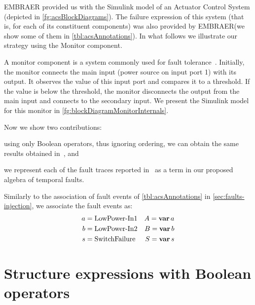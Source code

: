 \documentclass[12pt,openright,twoside,a4paper,oldfontcommands,english,brazil,final]{abntex2}
\theoremstyle{theo}
\newcommand{\EMBRAER}{EMBRAER\xspace}
\newcommand{\simulink}{Simulink\xspace}
\def\varop{\ensuremath\operatorname{\mathbf{var}}}
\newcommand{\var}[1]{\ensuremath\varop #1}
\begin{document}
\EMBRAER provided us with the \simulink model of an Actuator Control System (depicted in \cref{fg:acsBlockDiagrams}).
The failure expression of this system (that is, for each of its constituent components) was also provided by \EMBRAER (we show some of them in \cref{tbl:acsAnnotations}).
In what follows we illustrate our strategy using the Monitor component.

A monitor component is a system commonly used for fault tolerance~\cite{ONB2002,KK2007}.
Initially, the monitor connects the main input (power source on input port 1) with its output.
It observes the value of this input port and compares it to a threshold.
If the value is below the threshold, the monitor disconnects the output from the main input and connects to the secondary input.
We present the \simulink model for this monitor in \cref{fg:blockDiagramMonitorInternals}.


Now we show two contributions:
\begin{alineasinline}
  \item using only Boolean operators, thus ignoring ordering, we can obtain the same results obtained in~\cite{DM2012}, and
  \item we represent each of the fault traces reported in~\cite{DM2012} as a term in our proposed algebra of temporal faults.
\end{alineasinline}
Similarly to the association of fault events of \cref{tbl:acsAnnotations} in \cref{sec:faults-injection}, we associate the fault events as:
%
\begin{align*}
a &= \text{LowPower-In1}& A = \var a\\
b &= \text{LowPower-In2}& B = \var b\\
s &= \text{SwitchFailure}& S = \var s
\end{align*}

\section{Structure expressions with Boolean operators}
\end{document}
